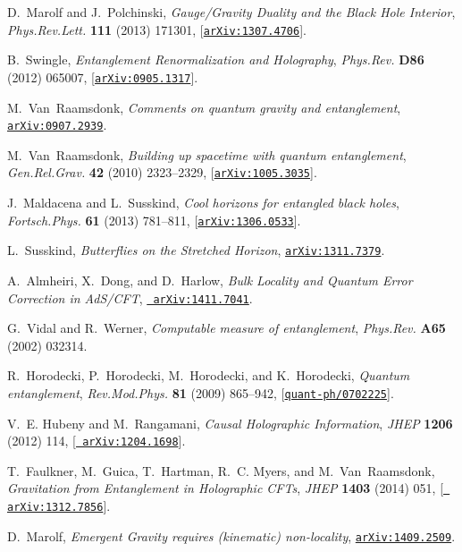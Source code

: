 \documentclass[12pt,a4paper]{article}
\begin{document}
\begin{thebibliography}{100}
D.~Marolf and J.~Polchinski, {\it {Gauge/Gravity Duality and the Black Hole
  Interior}},  {\em Phys.Rev.Lett.} {\bf 111} (2013) 171301,
  [\href{http://xxx.lanl.gov/abs/1307.4706}{{\tt arXiv:1307.4706}}].

B.~Swingle, {\it {Entanglement Renormalization and Holography}},  {\em
  Phys.Rev.} {\bf D86} (2012) 065007,
  [\href{http://xxx.lanl.gov/abs/0905.1317}{{\tt arXiv:0905.1317}}].

M.~Van~Raamsdonk, {\it {Comments on quantum gravity and entanglement}},
  \href{http://xxx.lanl.gov/abs/0907.2939}{{\tt arXiv:0907.2939}}.

M.~Van~Raamsdonk, {\it {Building up spacetime with quantum entanglement}},
  {\em Gen.Rel.Grav.} {\bf 42} (2010) 2323--2329,
  [\href{http://xxx.lanl.gov/abs/1005.3035}{{\tt arXiv:1005.3035}}].

J.~Maldacena and L.~Susskind, {\it {Cool horizons for entangled black holes}},
  {\em Fortsch.Phys.} {\bf 61} (2013) 781--811,
  [\href{http://xxx.lanl.gov/abs/1306.0533}{{\tt arXiv:1306.0533}}].

L.~Susskind, {\it {Butterflies on the Stretched Horizon}},
  \href{http://xxx.lanl.gov/abs/1311.7379}{{\tt arXiv:1311.7379}}.

A.~Almheiri, X.~Dong, and D.~Harlow, {\it {Bulk Locality and Quantum Error
  Correction in AdS/CFT}},  \href{http://xxx.lanl.gov/abs/1411.7041}{{\tt
  arXiv:1411.7041}}.

G.~Vidal and R.~Werner, {\it {Computable measure of entanglement}},  {\em
  Phys.Rev.} {\bf A65} (2002) 032314.

R.~Horodecki, P.~Horodecki, M.~Horodecki, and K.~Horodecki, {\it {Quantum
  entanglement}},  {\em Rev.Mod.Phys.} {\bf 81} (2009) 865--942,
  [\href{http://xxx.lanl.gov/abs/quant-ph/0702225}{{\tt quant-ph/0702225}}].

V.~E. Hubeny and M.~Rangamani, {\it {Causal Holographic Information}},  {\em
  JHEP} {\bf 1206} (2012) 114, [\href{http://xxx.lanl.gov/abs/1204.1698}{{\tt
  arXiv:1204.1698}}].

T.~Faulkner, M.~Guica, T.~Hartman, R.~C. Myers, and M.~Van~Raamsdonk, {\it
  {Gravitation from Entanglement in Holographic CFTs}},  {\em JHEP} {\bf 1403}
  (2014) 051, [\href{http://xxx.lanl.gov/abs/1312.7856}{{\tt
  arXiv:1312.7856}}].

D.~Marolf, {\it {Emergent Gravity requires (kinematic) non-locality}},
  \href{http://xxx.lanl.gov/abs/1409.2509}{{\tt arXiv:1409.2509}}.

\end{thebibliography}\endgroup
\end{document}
